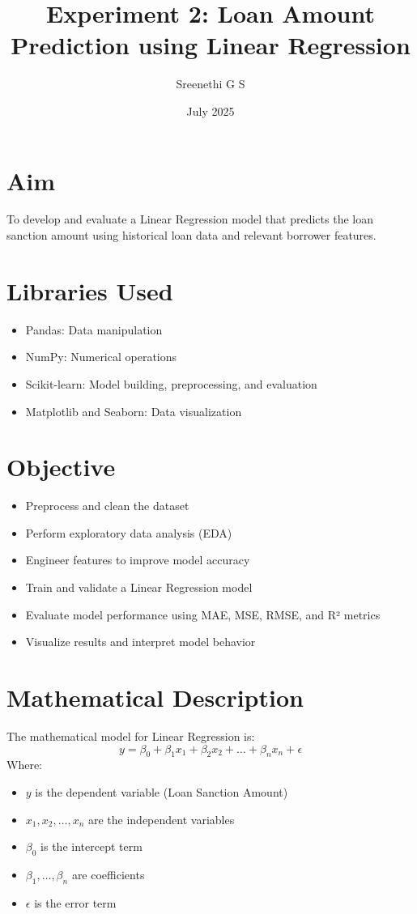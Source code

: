 \documentclass[12pt]{article}
\title{\textbf{Experiment 2: Loan Amount Prediction using Linear Regression}}
\author{Sreenethi G S}
\date{July 2025}
\begin{document}
\maketitle

\section*{Aim}
To develop and evaluate a Linear Regression model that predicts the loan sanction amount using historical loan data and relevant borrower features.

\section*{Libraries Used}
\begin{itemize}
  \item Pandas: Data manipulation
  \item NumPy: Numerical operations
  \item Scikit-learn: Model building, preprocessing, and evaluation
  \item Matplotlib and Seaborn: Data visualization
\end{itemize}

\section*{Objective}
\begin{itemize}
  \item Preprocess and clean the dataset
  \item Perform exploratory data analysis (EDA)
  \item Engineer features to improve model accuracy
  \item Train and validate a Linear Regression model
  \item Evaluate model performance using MAE, MSE, RMSE, and R² metrics
  \item Visualize results and interpret model behavior
\end{itemize}

\section*{Mathematical Description}
The mathematical model for Linear Regression is:
\[
y = \beta_0 + \beta_1 x_1 + \beta_2 x_2 + \dots + \beta_n x_n + \epsilon
\]
Where:
\begin{itemize}
  \item $y$ is the dependent variable (Loan Sanction Amount)
  \item $x_1, x_2, \dots, x_n$ are the independent variables
  \item $\beta_0$ is the intercept term
  \item $\beta_1, \dots, \beta_n$ are coefficients
  \item $\epsilon$ is the error term
\end{itemize}
\end{document}
